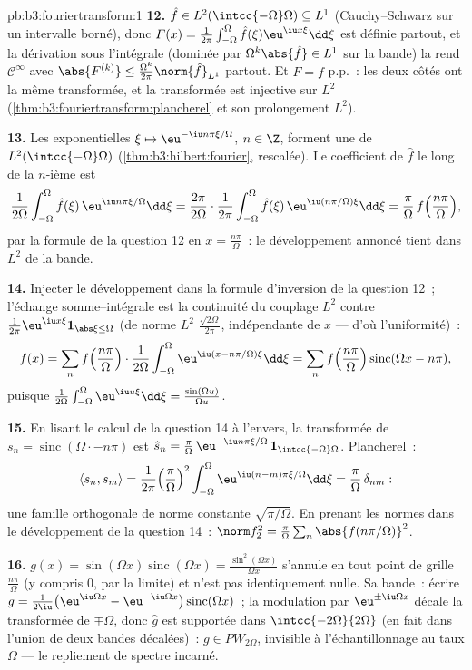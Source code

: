 \begin{solution}{pb:b3:fouriertransform:1}
\textbf{12.} $\hat f \in L^2(\intcc{-\Omega}\Omega)
\subseteq L^1$ (Cauchy--Schwarz sur un intervalle borné), donc
$F(x) = \frac1{2\pi}\int_{-\Omega}^\Omega\hat
f(\xi)\eu^{\iu x\xi}\dd\xi$ est définie partout, et la
dérivation sous l'intégrale (dominée par $\Omega^k\abs{\hat
f} \in L^1$ sur la bande) la rend $\mathcal C^\infty$ avec
$\abs{F^{(k)}} \leq
\frac{\Omega^k}{2\pi}\norm{\hat f}_{L^1}$ partout. Et $F =
f$ p.p.~: les deux côtés ont la même transformée, et la
transformée est injective sur $L^2$
(\cref{thm:b3:fouriertransform:plancherel} et son
prolongement $L^2$).

\textbf{13.} Les exponentielles $\xi \mapsto \eu^{-\iu
n\pi\xi/\Omega}$, $n \in \Z$, forment une 
de $L^2(\intcc{-\Omega}\Omega)$
(\cref{thm:b3:hilbert:fourier}, rescalée). Le coefficient de
$\hat f$ le long de la $n$-ième est
\[
\frac1{2\Omega}\int_{-\Omega}^\Omega\hat f(\xi)\,
\eu^{\iu n\pi\xi/\Omega}\dd\xi
= \frac{2\pi}{2\Omega}\cdot
\frac1{2\pi}\int_{-\Omega}^{\Omega}\hat f(\xi)\,
\eu^{\iu(n\pi/\Omega)\xi}\dd\xi
= \frac\pi\Omega\,f\Bigl(\frac{n\pi}\Omega\Bigr),
\]
par la formule de la question 12 en $x =
\frac{n\pi}\Omega$~: le développement annoncé tient dans
$L^2$ de la bande.

\textbf{14.} Injecter le développement dans la formule
d'inversion de la question 12~; l'échange somme--intégrale
est la continuité du couplage $L^2$ contre $\frac1{2\pi}
\eu^{\iu x\xi}\mathbf 1_{\abs\xi\leq\Omega}$ (de norme $L^2$
$\frac{\sqrt{2\Omega}}{2\pi}$, indépendante de $x$ --- d'où
l'uniformité)~:
\[
f(x) = \sum_nf\Bigl(\frac{n\pi}\Omega\Bigr)\cdot
\frac1{2\Omega}\int_{-\Omega}^\Omega
\eu^{\iu(x - n\pi/\Omega)\xi}\dd\xi
= \sum_nf\Bigl(\frac{n\pi}\Omega\Bigr)
\operatorname{sinc}(\Omega x - n\pi),
\]
puisque $\frac1{2\Omega}\int_{-\Omega}^\Omega\eu^{\iu
u\xi}\dd\xi = \frac{\sin(\Omega u)}{\Omega u}$.

\textbf{15.} En lisant le calcul de la question 14 à
l'envers, la transformée de $s_n =
\operatorname{sinc}(\Omega\cdot - n\pi)$ est $\hat s_n =
\frac\pi\Omega\,\eu^{-\iu n\pi\xi/\Omega}\,\mathbf
1_{\intcc{-\Omega}\Omega}$. Plancherel~:
\[
\langle s_n, s_m\rangle = \frac1{2\pi}
\Bigl(\frac\pi\Omega\Bigr)^2\int_{-\Omega}^\Omega
\eu^{\iu(n-m)\pi\xi/\Omega}\dd\xi =
\frac\pi\Omega\,\delta_{nm} :
\]
une famille orthogonale de norme constante
$\sqrt{\pi/\Omega}$. En prenant les normes dans le
développement de la question 14~: $\norm f_2^2 =
\frac\pi\Omega\sum_n\abs{f(n\pi/\Omega)}^2$.

\textbf{16.} $g(x) = \sin(\Omega x)\operatorname{sinc}
(\Omega x) = \frac{\sin^2(\Omega x)}{\Omega x}$ s'annule en
tout point de grille $\frac{n\pi}\Omega$ (y compris $0$, par
la limite) et n'est pas identiquement nulle. Sa bande~:
écrire $g = \frac1{2\iu}\bigl(\eu^{\iu\Omega x} -
\eu^{-\iu\Omega x}\bigr)\operatorname{sinc}(\Omega x)$~; la
modulation par $\eu^{\pm\iu\Omega x}$ décale la transformée
de $\mp\Omega$, donc $\hat g$ est supportée dans
$\intcc{-2\Omega}{2\Omega}$ (en fait dans l'union de deux
bandes décalées)~: $g \in PW_{2\Omega}$, invisible à
l'échantillonnage au taux $\Omega$ --- le repliement de
spectre incarné.


\end{solution}
